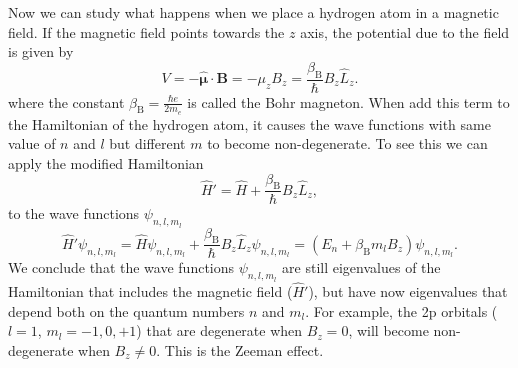 \documentclass[../Main/chem331-notes.tex]{subfiles}
\begin{document}
Now we can study what happens when we place a hydrogen atom in a magnetic field. If the magnetic field points towards the $z$ axis, the potential due to the field is given by
\begin{equation}
V = - \hat{\boldsymbol{\mu}} \cdot \mathbf{B} = - \mu_z B_z = \frac{\beta_\mathrm{B}}{\hbar} B_z \hat{L}_z.
\end{equation}
where the constant $\beta_\mathrm{B} = \frac{\hbar e}{2m_e}$ is called the Bohr magneton.
When add this term to the Hamiltonian of the hydrogen atom, it causes the wave functions with same value of $n$ and $l$ but different $m$ to become non-degenerate. To see this we can apply the modified Hamiltonian
\begin{equation}
\hat{H}' = \hat{H} + \frac{\beta_\mathrm{B}}{\hbar} B_z \hat{L}_z,
\end{equation}
to the wave functions $\psi_{n,l,m_l}$
\begin{equation}
\hat{H}' \psi_{n,l,m_l} = \hat{H} \psi_{n,l,m_l} + \frac{\beta_\mathrm{B}}{\hbar} B_z \hat{L}_z  \psi_{n,l,m_l}
= \left( E_n + \beta_\mathrm{B} m_l B_z  \right) \psi_{n,l,m_l}.
\end{equation}
We conclude that the wave functions $\psi_{n,l,m_l}$ are still eigenvalues of the Hamiltonian that includes the magnetic field ($\hat{H}'$), but have now eigenvalues that depend both on the quantum numbers $n$ and $m_l$. For example, the 2p orbitals ($l = 1$, $m_l = -1,0,+1$) that are degenerate when $B_z = 0$, will become non-degenerate when $B_z \neq 0$. This is the Zeeman effect.
\end{document}
